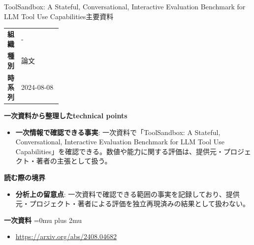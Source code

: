 \begin{technicalnote}{ToolSandbox: A Stateful, Conversational, Interactive Evaluation Benchmark for LLM Tool Use Capabilities}{主要資料}
\begingroup
\begin{tabularx}{\linewidth}{@{}>{\bfseries}p{0.22\linewidth}X@{}}
組織 & - \\
種別 & 論文 \\
時系列 & 2024-08-08 \\
\end{tabularx}
\smallskip
{\bfseries 一次資料から整理したtechnical points}
\begin{itemize}[leftmargin=1.5em,itemsep=0.35em]
\item \textbf{一次情報で確認できる事実}: 一次資料で「ToolSandbox: A Stateful, Conversational, Interactive Evaluation Benchmark for LLM Tool Use Capabilities」を確認できる。数値や能力に関する評価は、提供元・プロジェクト・著者の主張として扱う。
\end{itemize}
\begin{minipage}{\linewidth}
{\bfseries 読む際の境界}
\begin{itemize}[leftmargin=1.5em,itemsep=0.35em]
\item \textbf{分析上の留意点}: 一次資料で確認できる範囲の事実を記録しており、提供元・プロジェクト・著者による評価を独立再現済みの結果として扱わない。
\end{itemize}
\begin{samepage}
{\bfseries 一次資料}
\begingroup\sloppy
\Urlmuskip=0mu plus 2mu\relax
\begin{itemize}[leftmargin=1.5em,itemsep=0.25em]
\item {\scriptsize\url{https://arxiv.org/abs/2408.04682}}
\end{itemize}
\endgroup
\end{samepage}
\end{minipage}
\endgroup
\end{technicalnote}
\medskip

